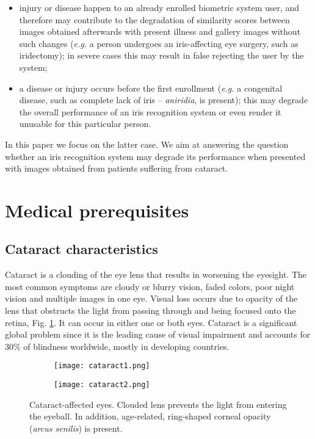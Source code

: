 \documentclass[a4paper]{spie}
\begin{document}
\begin{itemize}
\item injury or disease happen to an already enrolled biometric system user, and therefore may contribute to the degradation of similarity scores between images obtained afterwards with present illness and gallery images without such changes (\emph{e.g.} a person undergoes an iris-affecting eye surgery, such as iridectomy); in severe cases this may result in false rejecting the user by the system; 
\item a disease or injury occurs before the first enrollment (\emph{e.g.} a congenital disease, such as complete lack of iris -- \emph{aniridia}, is present); this may degrade the overall performance of an iris recognition system or even render it unusable for this particular person.
\end{itemize}

In this paper we focus on the latter case. We aim at answering the question whether an iris recognition system may degrade its performance when presented with images obtained from patients suffering from cataract. 

\section{Medical prerequisites}

\subsection{Cataract characteristics}

Cataract is a clouding of the eye lens that results in worsening the eyesight. The most common symptoms are cloudy or blurry vision, faded colors, poor night vision and multiple images in one eye. Visual loss occurs due to opacity of the lens that obstructs the light from passing through and being focused onto the retina, Fig. \ref{cataract}. It can occur in either one or both eyes. Cataract is a significant global problem since it is the leading cause of visual impairment and accounts for 30\% of blindness worldwide, mostly in developing countries.

\begin{figure}
\centering
\begin{subfigure}{0.5\textwidth}
  \centering
  \texttt{[image: cataract1.png]}
\end{subfigure}%
\begin{subfigure}{0.5\textwidth}
  \centering
  \texttt{[image: cataract2.png]}
\end{subfigure}
\vskip0.2cm
\caption{Cataract-affected eyes. Clouded lens prevents the light from entering the eyeball. In addition, age-related, ring-shaped corneal opacity (\emph{arcus senilis}) is present.}
\label{cataract}
\end{figure}
\end{document}
